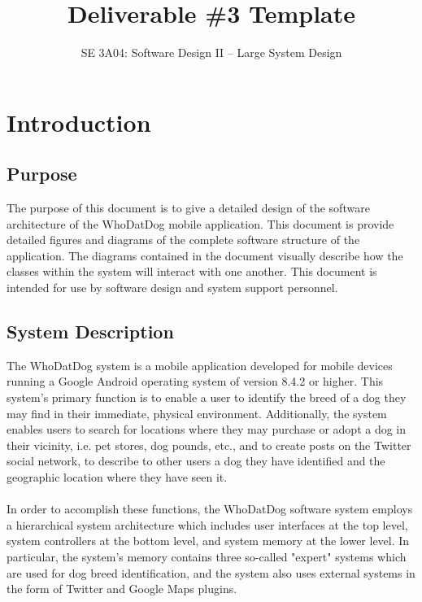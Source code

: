 \documentclass[]{article}
\title{Deliverable \#3 Template}
\author{SE 3A04: Software Design II -- Large System Design}
\date{}
\begin{document}
	
	\maketitle	
	
	\section{Introduction}
	\label{sec:introduction}
	
	\subsection{Purpose}
	\label{sec:purpose}
	
	The purpose of this document is to give a detailed design of the software architecture of the WhoDatDog mobile application. This document is provide detailed figures and diagrams of the complete software structure of the application. The diagrams contained in the document visually describe how the classes within the system will interact with one another. This document is intended for use by software design and system support personnel.
	
	\subsection{System Description}
	\label{sec:sysdescription}
	
	The WhoDatDog system is a mobile application developed for mobile devices running a Google Android operating system of version 8.4.2 or higher. This system's primary function is to enable a user to identify the breed of a dog they may find in their immediate, physical environment. Additionally, the system enables users to search for locations where they may purchase or adopt a dog in their vicinity, i.e. pet stores, dog pounds, etc., and to create posts on the Twitter social network, to describe to other users a dog they have identified and the geographic location where they have seen it.\\\\In order to accomplish these functions, the WhoDatDog software system employs a hierarchical system architecture which includes user interfaces at the top level, system controllers at the bottom level, and system memory at the lower level. In particular, the system's memory contains three so-called "expert" systems which are used for dog breed identification, and the system also uses external systems in the form of Twitter and Google Maps plugins.
	
\end{document}
